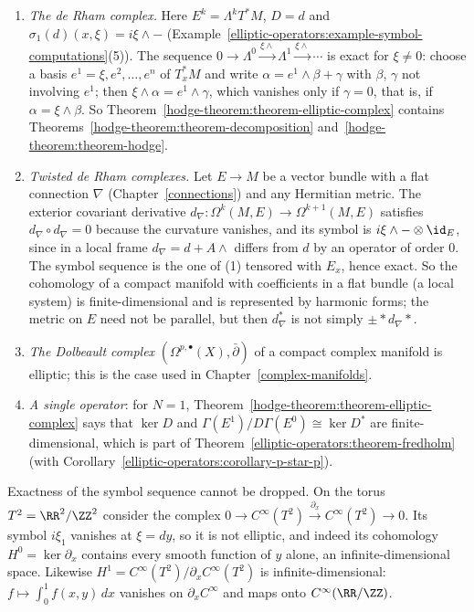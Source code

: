 \begin{example}\label{hodge-theorem:example-elliptic-complexes}
\begin{enumerate}
\item \emph{The de Rham complex.} Here $E^k = \Lambda^kT^*M$, $D = d$ and $\sigma_1(d)(x, \xi) = i\xi \wedge -$ (Example~\ref{elliptic-operators:example-symbol-computations}(5)). The sequence
$0 \to \Lambda^0 \xrightarrow{\xi\wedge} \Lambda^1 \xrightarrow{\xi\wedge} \cdots$ is exact for $\xi \neq 0$: choose a basis $e^1 = \xi, e^2, \ldots, e^n$ of $T^*_xM$ and write $\alpha = e^1 \wedge \beta + \gamma$ with $\beta$,
$\gamma$ not involving $e^1$; then $\xi \wedge \alpha = e^1 \wedge \gamma$, which vanishes only if $\gamma = 0$, that is, if $\alpha = \xi \wedge \beta$. So
Theorem~\ref{hodge-theorem:theorem-elliptic-complex} contains Theorems~\ref{hodge-theorem:theorem-decomposition} and~\ref{hodge-theorem:theorem-hodge}.
\item \emph{Twisted de Rham complexes.} Let $E \to M$ be a vector bundle with a flat connection $\nabla$ (Chapter~\ref{connections}) and any Hermitian metric. The exterior covariant derivative
$d_\nabla \colon \Omega^k(M, E) \to \Omega^{k+1}(M, E)$ satisfies $d_\nabla \circ d_\nabla = 0$ because the curvature vanishes, and its symbol is $i\xi \wedge - \otimes \id_E$, since in a local frame
$d_\nabla = d + A\wedge$ differs from $d$ by an operator of order $0$. The symbol sequence is the one of (1) tensored with $E_x$, hence exact. So the cohomology of a compact manifold with coefficients in a
flat bundle (a local system) is finite-dimensional and is represented by harmonic forms; the metric on $E$ need not be parallel, but then $d_\nabla^*$ is not simply $\pm{*}d_\nabla{*}$.
\item \emph{The Dolbeault complex} $(\Omega^{p,\bullet}(X), \bar\partial)$ of a compact complex manifold is elliptic; this is the case used in Chapter~\ref{complex-manifolds}.
\item \emph{A single operator}: for $N = 1$, Theorem~\ref{hodge-theorem:theorem-elliptic-complex} says that $\ker D$ and $\Gamma(E^1)/D\Gamma(E^0) \cong \ker D^*$ are finite-dimensional, which is
part of Theorem~\ref{elliptic-operators:theorem-fredholm} (with Corollary~\ref{elliptic-operators:corollary-p-star-p}).
\end{enumerate}
\end{example}

\begin{counterexample}\label{hodge-theorem:counterexample-not-elliptic-complex}
Exactness of the symbol sequence cannot be dropped. On the torus $T^2 = \RR^2/\ZZ^2$ consider the complex $0 \to C^\infty(T^2) \xrightarrow{\partial_x} C^\infty(T^2) \to 0$. Its symbol $i\xi_1$ vanishes at
$\xi = dy$, so it is not elliptic, and indeed its cohomology $H^0 = \ker\partial_x$ contains every smooth function of $y$ alone, an infinite-dimensional space. Likewise $H^1 = C^\infty(T^2)/\partial_xC^\infty(T^2)$
is infinite-dimensional: $f \mapsto \int_0^1f(x, y)\,dx$ vanishes on $\partial_xC^\infty$ and maps onto $C^\infty(\RR/\ZZ)$.
\end{counterexample}

